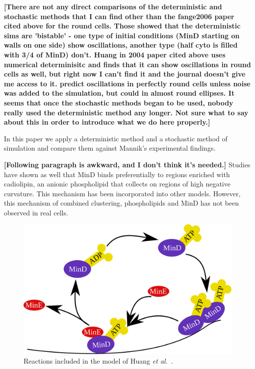 \documentclass[letterpaper,twocolumn,amsmath,amssymb,pre]{revtex4-1}
\newcommand{\red}[1]{{\bf \color{red} #1}}
\newcommand{\fixme}[1]{\red{[#1]}}
\begin{document}
\fixme{There are not any direct comparisons of the deterministic and
  stochastic methods that I can find other than the fange2006 paper
  cited above for the round cells.  Those showed that the
  deterministic sims are 'bistable' - one type of initial conditions
  (MinD starting on walls on one side) show oscillations, another type
  (half cyto is filled with 3/4 of MinD) don't.  Huang in 2004 paper
  cited above uses numerical determinisitc and finds that it can show
  oscillations in round cells as well, but right now I can't find it
  and the journal doesn't give me access to it.  predict oscillations
  in perfectly round cells unless noise was added to the simulation,
  but could in almost round ellipses.  It seems that once the
  stochastic methods began to be used, nobody really used the
  deterministic method any longer.  Not sure what to say about this in
  order to introduce what we do here properly.}

In this paper we apply a deterministic method and a stochastic method
of simulation and compare them against Mannik's experimental findings.


\fixme{Following paragraph is awkward, and I don't think it's needed.}
Studies have shown as well that MinD binds preferentially to regions
enriched with cadiolipin, an anionic phospholipid that collects on
regions of high negative curvature. This mechanism has been
incorporated into other
models.\cite{drew2005polymerization,cytrynbaum2007multistranded,renner2012mind,renner2012mind}
However, this mechanism of combined clustering, phospholipids and MinD
has not been observed in real cells. \cite{halatek2012highly}


\begin{figure}
  \includegraphics[width=\columnwidth]{reactions}
  \caption{Reactions included in the model of Huang \emph{et
      al.}~\cite{huang2003dynamic}.}\label{fig:reactions}
\end{figure}
\end{document}
